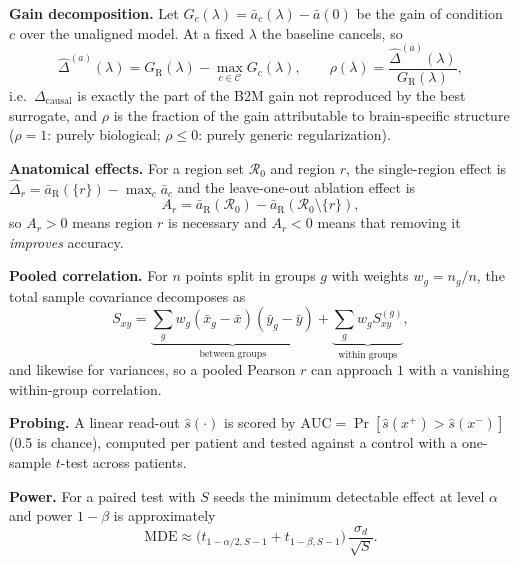 \documentclass[conference]{IEEEtran}
\newcommand{\dcausal}{\Delta_{\mathrm{causal}}}
\begin{document}
\textbf{Gain decomposition.} Let $G_c(\lambda)=\bar a_c(\lambda)-\bar a(0)$ be the gain of condition $c$ over the unaligned model. At a fixed $\lambda$ the baseline cancels, so
\begin{equation}
  \hat\Delta^{(a)}(\lambda)=G_{\mathrm R}(\lambda)-\max_{c\in\mathcal C}G_c(\lambda),\qquad \rho(\lambda)=\frac{\hat\Delta^{(a)}(\lambda)}{G_{\mathrm R}(\lambda)}, \label{eq:gain}
\end{equation}
i.e.\ $\dcausal$ is exactly the part of the B2M gain not reproduced by the best surrogate, and $\rho$ is the fraction of the gain attributable to brain-specific structure ($\rho=1$: purely biological; $\rho\le0$: purely generic regularization).

\textbf{Anatomical effects.} For a region set $\mathcal R_0$ and region $r$, the single-region effect is $\hat\Delta_r=\bar a_{\mathrm R}(\{r\})-\max_{c}\bar a_c$ and the leave-one-out ablation effect is
\begin{equation}
  A_r=\bar a_{\mathrm R}(\mathcal R_0)-\bar a_{\mathrm R}(\mathcal R_0\setminus\{r\}),\label{eq:abl}
\end{equation}
so $A_r>0$ means region $r$ is necessary and $A_r<0$ means that removing it \emph{improves} accuracy.

\textbf{Pooled correlation.} For $n$ points split in groups $g$ with weights $w_g=n_g/n$, the total sample covariance decomposes as
\begin{equation}
  S_{xy}=\underbrace{\sum_g w_g(\bar x_g-\bar x)(\bar y_g-\bar y)}_{\text{between groups}}+\underbrace{\sum_g w_g S^{(g)}_{xy}}_{\text{within groups}},\label{eq:pool}
\end{equation}
and likewise for variances, so a pooled Pearson $r$ can approach $1$ with a vanishing within-group correlation.

\textbf{Probing.} A linear read-out $\hat s(\cdot)$ is scored by $\mathrm{AUC}=\Pr[\hat s(x^+)>\hat s(x^-)]$ (0.5 is chance), computed per patient and tested against a control with a one-sample $t$-test across patients.

\textbf{Power.} For a paired test with $S$ seeds the minimum detectable effect at level $\alpha$ and power $1-\beta$ is approximately
\begin{equation}
  \mathrm{MDE}\approx\big(t_{1-\alpha/2,S-1}+t_{1-\beta,S-1}\big)\,\frac{\sigma_d}{\sqrt S}. \label{eq:mde}
\end{equation}

\end{document}
